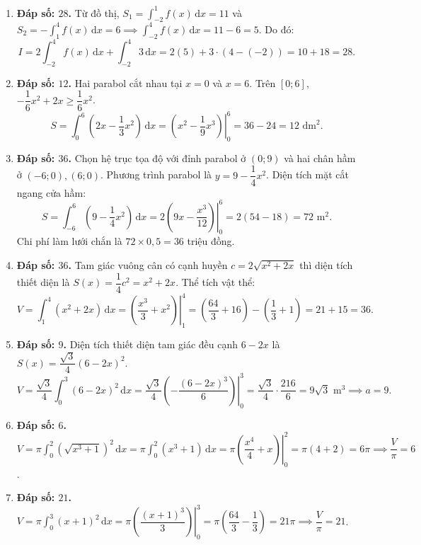 \documentclass[12pt,a4paper]{article}
\begin{document}
\begin{enumerate}[start=21]
\item \textbf{Đáp số: $28$.}  
Từ đồ thị, $S_1 = \int_{-2}^1 f(x)\,\mathrm{d}x = 11$ và $S_2 = -\int_1^4 f(x)\,\mathrm{d}x = 6 \implies \int_{-2}^4 f(x)\,\mathrm{d}x = 11 - 6 = 5$.  
Do đó:
\[
I = 2\int_{-2}^4 f(x)\,\mathrm{d}x + \int_{-2}^4 3\,\mathrm{d}x = 2(5) + 3\cdot (4 - (-2)) = 10 + 18 = 28.
\]

\item \textbf{Đáp số: $12$.}  
Hai parabol cắt nhau tại $x = 0$ và $x = 6$. Trên $[0; 6]$, $-\dfrac{1}{6}x^2 + 2x \ge \dfrac{1}{6}x^2$.  
\[
S = \int_0^6 \left(2x - \dfrac{1}{3}x^2\right)\,\mathrm{d}x = \left.\left(x^2 - \dfrac{1}{9}x^3\right)\right|_0^6 = 36 - 24 = 12\text{ dm}^2.
\]

\item \textbf{Đáp số: $36$.}  
Chọn hệ trục tọa độ với đỉnh parabol ở $(0; 9)$ và hai chân hầm ở $(-6; 0), (6; 0)$.  
Phương trình parabol là $y = 9 - \dfrac{1}{4}x^2$. Diện tích mặt cắt ngang cửa hầm:
\[
S = \int_{-6}^6 \left(9 - \dfrac{1}{4}x^2\right)\,\mathrm{d}x = 2\left.\left(9x - \dfrac{x^3}{12}\right)\right|_0^6 = 2(54 - 18) = 72\text{ m}^2.
\]
Chi phí làm lưới chắn là $72 \times 0{,}5 = 36$ triệu đồng.

\item \textbf{Đáp số: $36$.}  
Tam giác vuông cân có cạnh huyền $c = 2\sqrt{x^2 + 2x}$ thì diện tích thiết diện là $S(x) = \dfrac{1}{4}c^2 = x^2 + 2x$.  
Thể tích vật thể:
\[
V = \int_1^4 (x^2 + 2x)\,\mathrm{d}x = \left.\left(\dfrac{x^3}{3} + x^2\right)\right|_1^4 = \left(\dfrac{64}{3} + 16\right) - \left(\dfrac{1}{3} + 1\right) = 21 + 15 = 36.
\]

\item \textbf{Đáp số: $9$.}  
Diện tích thiết diện tam giác đều cạnh $6 - 2x$ là $S(x) = \dfrac{\sqrt{3}}{4}(6 - 2x)^2$.  
\[
V = \dfrac{\sqrt{3}}{4}\int_0^3 (6 - 2x)^2\,\mathrm{d}x = \dfrac{\sqrt{3}}{4}\left.\left(-\dfrac{(6 - 2x)^3}{6}\right)\right|_0^3 = \dfrac{\sqrt{3}}{4} \cdot \dfrac{216}{6} = 9\sqrt{3}\text{ m}^3 \implies a = 9.
\]

\item \textbf{Đáp số: $6$.}  
$V = \pi\int_0^2 \left(\sqrt{x^3 + 1}\right)^2\,\mathrm{d}x = \pi\int_0^2 (x^3 + 1)\,\mathrm{d}x = \pi\left.\left(\dfrac{x^4}{4} + x\right)\right|_0^2 = \pi(4 + 2) = 6\pi \implies \dfrac{V}{\pi} = 6$.

\item \textbf{Đáp số: $21$.}  
$V = \pi\int_0^3 (x + 1)^2\,\mathrm{d}x = \pi\left.\left(\dfrac{(x + 1)^3}{3}\right)\right|_0^3 = \pi\left(\dfrac{64}{3} - \dfrac{1}{3}\right) = 21\pi \implies \dfrac{V}{\pi} = 21$.


\end{enumerate}
\end{document}
